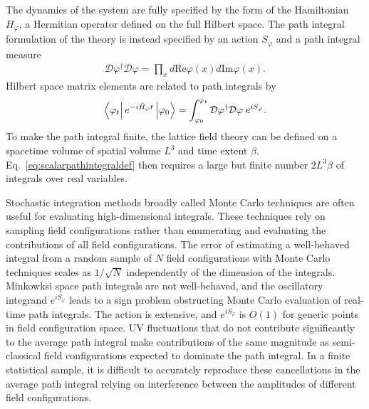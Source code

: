 The dynamics of the system are fully specified by the form of the Hamiltonian $H_\varphi$, a Hermitian operator defined on the full Hilbert space.
The path integral formulation of the theory is instead specified by an action $S_\varphi$ and a path integral measure
\begin{equation}
  \begin{split}
    \mathcal{D}\varphi^\dagger\mathcal{D}\varphi = \prod_x d\text{Re}\varphi(x)d\text{Im}\varphi(x).
  \end{split}\label{eq:scalarmeasuredef}
\end{equation}
Hilbert space matrix elements are related to path integrals by
\begin{equation}
  \begin{split}
    \mbraket{\varphi_t}{e^{-i\hat{H}_\varphi t}}{\varphi_0} = \int_{\varphi_0}^{\varphi_t} \mathcal{D}\varphi^\dagger \mathcal{D}\varphi\;e^{iS_\varphi}.
  \end{split}\label{eq:scalarpathintegraldef}
\end{equation}
To make the path integral finite, the lattice field theory can be defined on a spacetime volume of spatial volume $L^3$ and time extent $\beta$.
Eq.~\eqref{eq:scalarpathintegraldef} then requires a large but finite number $2L^3\beta$ of integrals over real variables. 

Stochastic integration methods broadly called Monte Carlo techniques are often useful for evaluating high-dimensional integrals.
These techniques rely on sampling field configurations rather than enumerating and evaluating the contributions of all field configurations.
The error of estimating a well-behaved integral from a random sample of $N$ field configurations with Monte Carlo techniques scales as $1/\sqrt{N}$ independently of the dimension of the integrals.
Minkowksi space path integrals are not well-behaved, and the oscillatory integrand $e^{iS_\varphi}$ leads to a sign problem obstructing Monte Carlo evaluation of real-time path integrals.
The action is extensive, and $e^{iS_\varphi}$ is $O(1)$ for generic points in field configuration space.
UV fluctuations that do not contribute significantly to the average path integral make contributions of the same magnitude as semi-classical field configurations expected to dominate the path integral.
In a finite statistical sample, it is difficult to accurately reproduce these cancellations in the average path integral relying on interference between the amplitudes of different field configurations.

